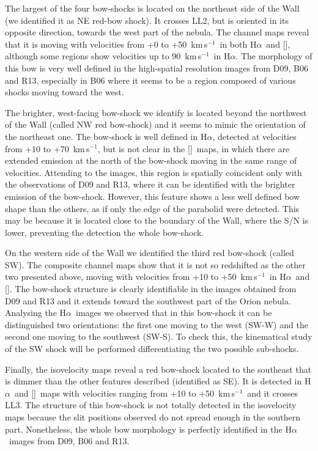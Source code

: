 \documentclass[a4paper,fleqn,usenatbib]{mnras}     %
\newcommand{\Ha} {H$\alpha$}      		%
\newcommand{\NII} {[\ion{N}{ii}]}            %
\newcommand{\kms}{\,km\,s$^{-1}$}	       %
\begin{document}
The largest of the four bow-shocks is located on the northeast side of the Wall (we identified it as NE red-bow shock). It crosses LL2, but is 
oriented in its opposite direction, towards the west part of the nebula.  The channel maps reveal that it is moving with velocities from +0 
to +50 \kms~in both \Ha~and \NII, although some regions show velocities up to 90 \kms~in \Ha.  The morphology of this bow  is very 
well defined in the high-spatial resolution images from D09, B06 and R13, especially in B06 where it seems to be a region composed of 
various shocks moving toward the west. 

The brighter, west-facing bow-shock we identify is located beyond the northwest of the Wall (called NW red bow-shock) and it seems to mimic the orientation of the 
northeast one. The bow-shock is well defined in \Ha, detected at velocities from +10 to +70 \kms, but is not clear in the \NII~maps, in 
which there are extended emission at the north of the bow-shock moving in the same range of velocities. Attending to the images, this region 
is spatially coincident only with the observations of D09 and R13, where it can be identified with the brighter 
emission of the bow-shock. However, this feature shows a less well defined bow shape than the others, as if only the edge of the parabolid 
were detected. This may be because it is located close to the boundary of the Wall, where the S/N is lower, preventing the detection the whole bow-shock.

On the western side of the Wall we identified the third red bow-shock (called SW). The composite channel maps show that it is not so redshifted as the
other two presented above, moving with velocities from +10 to +50 \kms~in \Ha~and \NII. The bow-shock structure is clearly identifiable in 
the images obtained from D09 and R13 and it extends toward the southwest part of the Orion nebula. Analysing the \Ha~images we observed that in 
this bow-shock it can be distinguished two orientations: the first one moving to the west (SW-W) and the second one moving to the southwest 
(SW-S). To check this, the kinematical study of the SW shock will be performed differentiating the two possible sub-shocks.  

Finally, the isovelocity maps reveal a red bow-shock located to the southeast that is dimmer than the other features described (identified as SE). It is 
detected in \Ha~and \NII~maps with velocities ranging from +10 to +50 \kms~and it crosses LL3. The structure of this bow-shock is not totally detected 
in the isovelocity maps because the slit positions observed do not spread enough in the southern part. Nonetheless, the whole bow morphology is 
perfectly identified in the \Ha~images from D09, B06 and R13.\\
\end{document}
